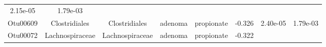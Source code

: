 \documentclass[11pt,]{article}
\begin{document}
\begin{longtable}[]{@{}cccccccc@{}}
\begin{minipage}[t]{0.08\columnwidth}
2.15e-05\strut
\end{minipage} & \begin{minipage}[t]{0.08\columnwidth}\centering\strut
1.79e-03\strut
\end{minipage}\tabularnewline
\begin{minipage}[t]{0.08\columnwidth}\centering\strut
Otu00609\strut
\end{minipage} & \begin{minipage}[t]{0.15\columnwidth}\centering\strut
Clostridiales\strut
\end{minipage} & \begin{minipage}[t]{0.15\columnwidth}\centering\strut
Clostridiales\strut
\end{minipage} & \begin{minipage}[t]{0.08\columnwidth}\centering\strut
adenoma\strut
\end{minipage} & \begin{minipage}[t]{0.09\columnwidth}\centering\strut
propionate\strut
\end{minipage} & \begin{minipage}[t]{0.07\columnwidth}\centering\strut
-0.326\strut
\end{minipage} & \begin{minipage}[t]{0.08\columnwidth}\centering\strut
2.40e-05\strut
\end{minipage} & \begin{minipage}[t]{0.08\columnwidth}\centering\strut
1.79e-03\strut
\end{minipage}\tabularnewline
\begin{minipage}[t]{0.08\columnwidth}\centering\strut
Otu00072\strut
\end{minipage} & \begin{minipage}[t]{0.15\columnwidth}\centering\strut
Lachnospiraceae\strut
\end{minipage} & \begin{minipage}[t]{0.15\columnwidth}\centering\strut
Lachnospiraceae\strut
\end{minipage} & \begin{minipage}[t]{0.08\columnwidth}\centering\strut
adenoma\strut
\end{minipage} & \begin{minipage}[t]{0.09\columnwidth}\centering\strut
propionate\strut
\end{minipage} & \begin{minipage}[t]{0.07\columnwidth}\centering\strut
-0.322\strut
\end{minipage} & \begin{minipage}[t]{0.08\columnwidth}\centering\strut

\end{minipage}
\end{longtable}
\end{document}
